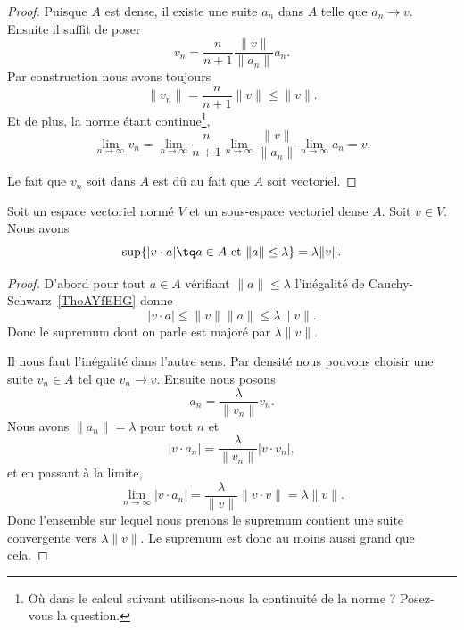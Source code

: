 \begin{proof}
	Puisque \( A\) est dense, il existe une suite \( a_n\) dans \( A\) telle que \( a_n\to v\). Ensuite il suffit de poser
	\begin{equation}
		v_n=\frac{ n }{ n+1 }\frac{ \| v \| }{ \| a_n \| }a_n.
	\end{equation}
	Par construction nous avons toujours
	\begin{equation}
		\| v_n \|=\frac{ n }{ n+1 }\| v \|\leq \| v \|.
	\end{equation}
	Et de plus, la norme étant continue\footnote{Où dans le calcul suivant utilisons-nous la continuité de la norme ? Posez-vous la question.},
	\begin{equation}
		\lim_{n\to \infty} v_n=\lim_{n\to \infty} \frac{ n }{ n+1 }\lim_{n\to \infty} \frac{ \| v \| }{ \| a_n \| }\lim_{n\to \infty} a_n=v.
	\end{equation}

	Le fait que \( v_n\) soit dans \( A\) est dû au fait que \( A\) soit vectoriel.
\end{proof}

\begin{proposition}     \label{PROPooVEMGooYKhMFy}
	Soit un espace vectoriel normé \( V\) et un sous-espace vectoriel dense \( A\). Soit \( v\in V\). Nous avons
	\begin{equation}
		\sup\{ | v\cdot a |\tq a\in A\text{ et }\| a \|\leq \lambda \}=\lambda\| v \|.
	\end{equation}
\end{proposition}

\begin{proof}
	D'abord pour tout \( a\in A\) vérifiant \( \| a \|\leq \lambda\) l'inégalité de Cauchy-Schwarz~\ref{ThoAYfEHG} donne
	\begin{equation}
		| v\cdot a |\leq \| v \|\| a \|\leq \lambda\| v \|.
	\end{equation}
	Donc le supremum dont on parle est majoré par \( \lambda\| v \|\).

	Il nous faut l'inégalité dans l'autre sens. Par densité nous pouvons choisir une suite \( v_n\in A\) tel que \( v_n\to v\). Ensuite nous posons
	\begin{equation}
		a_n=\frac{ \lambda }{ \| v_n \| }v_n.
	\end{equation}
	Nous avons \( \| a_n \|=\lambda\) pour tout \( n\) et
	\begin{equation}
		| v\cdot a_n |=\frac{ \lambda }{ \| v_n \| }| v\cdot v_n |,
	\end{equation}
	et en passant à la limite,
	\begin{equation}
		\lim_{n\to \infty} | v\cdot a_n |=\frac{ \lambda }{ \| v \| }\| v\cdot v \|=\lambda\| v \|.
	\end{equation}
	Donc l'ensemble sur lequel nous prenons le supremum contient une suite convergente vers \( \lambda\| v \|\). Le supremum est donc au moins aussi grand que cela.
\end{proof}

